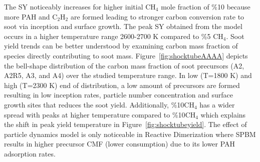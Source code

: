 The SY noticeably increases for higher initial $\mathrm{CH_4}$ mole fraction of \%10 because more PAH and $\mathrm{C_2H_2}$ are formed leading to stronger carbon conversion rate to soot via inception and surface growth. The peak SY obtained from the model occurs in a higher temperature range 2600-2700 K compared to \%5 $\mathrm{CH_4}$. Soot yield trends can be better understood by examining carbon mass fraction of species directly contributing to soot mass. Figure~\ref{fig:shocktubeAAAA} depicts the bell-shape distribution of the carbon mass fraction of soot precursors (A2, A2R5, A3, and A4) over the studied temperature range. In low (T=1800 K) and high (T=2300 K) end of distribution, a low amount of precursors are formed resulting in low inception rates, particle number concentration and surface growth sites that reduces the soot yield. Additionally, \%10$\mathrm{CH_4}$ has a wider spread with peaks at higher temperature compared to \%10$\mathrm{CH_4}$ which explains the shift in peak yield temperature in Figure~\ref{fig:shocktubeyield}. The effect of particle dynamics model is only noticeable in Reactive Dimerization where SPBM results in higher precursor CMF (lower consumption) due to its lower PAH adsorption rates. %


